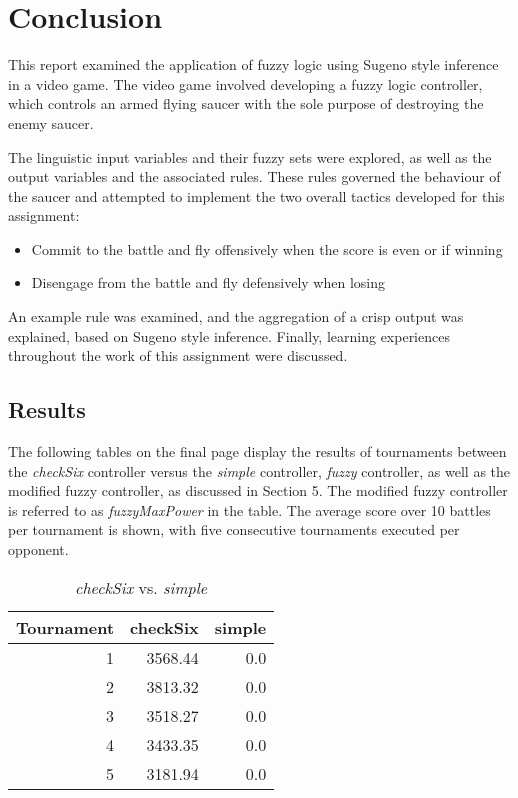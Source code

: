 \newpage

\section{Conclusion}

This report examined the application of fuzzy logic using Sugeno style inference in a video game. The video game involved developing a fuzzy logic controller, which controls an armed flying saucer with the sole purpose of destroying the enemy saucer.

The linguistic input variables and their fuzzy sets were explored, as well as the output variables and the associated rules. These rules governed the behaviour of the saucer and attempted to implement the two overall tactics developed for this assignment:

\begin{itemize}
	\item Commit to the battle and fly offensively when the score is even or if winning
	\item Disengage from the battle and fly defensively when losing
\end{itemize}

An example rule was examined, and the aggregation of a crisp output was explained, based on Sugeno style inference. Finally, learning experiences throughout the work of this assignment were discussed.

\subsection{Results}

The following tables on the final page display the results of tournaments between the \emph{checkSix} controller versus the \emph{simple} controller, \emph{fuzzy} controller, as well as the modified fuzzy controller, as discussed in Section 5. The modified fuzzy controller is referred to as \emph{fuzzyMaxPower} in the table. The average score over 10 battles per tournament is shown, with five consecutive tournaments executed per opponent.

\newpage

\begin{table}[H]
\centering
\caption{\emph{checkSix} vs. \emph{simple}}
\label{checkSix vs. simple}
\begin{tabular}{r|r|r}
Tournament	& checkSix	& simple	\\ \hline
1			& 3568.44	& 0.0		\\
2			& 3813.32	& 0.0		\\
3			& 3518.27	& 0.0		\\
4			& 3433.35	& 0.0		\\
5			& 3181.94	& 0.0
\end{tabular}
\end{table}

